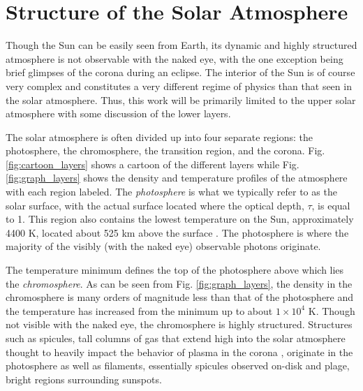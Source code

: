 \section{Structure of the Solar Atmosphere}
\label{sec:structure}
\par Though the Sun can be easily seen from Earth, its dynamic and highly structured atmosphere is not observable with the naked eye, with the one exception being brief glimpses of the corona during an eclipse. The interior of the Sun is of course very complex and constitutes a very different regime of physics than that seen in the solar atmosphere. Thus, this work will be primarily limited to the upper solar atmosphere with some discussion of the lower layers.
%
\par The solar atmosphere is often divided up into four separate regions: the photosphere, the chromosphere, the transition region, and the corona. Fig. \ref{fig:cartoon_layers} shows a cartoon of the different layers while Fig. \ref{fig:graph_layers} shows the density and temperature profiles of the atmosphere with each region labeled. The \textit{photosphere} is what we typically refer to as the solar surface, with the actual surface located where the optical depth, $\tau$, is equal to 1. This region also contains the lowest temperature on the Sun, approximately 4400 K, located about 525 km above the surface \citep{carroll_introduction_2007}. The photosphere is where the majority of the visibly (with the naked eye) observable photons originate.
%
\par The temperature minimum defines the top of the photosphere above which lies the \textit{chromosphere}. As can be seen from Fig. \ref{fig:graph_layers}, the density in the chromosphere is many orders of magnitude less than that of the photosphere and the temperature has increased from the minimum up to about $1\times10^4$ K. Though not visible with the naked eye, the chromosphere is highly structured. Structures such as spicules, tall columns of gas that extend high into the solar atmosphere thought to heavily impact the behavior of plasma in the corona \citep{de_pontieu_origins_2011}, originate in the photosphere as well as filaments, essentially spicules observed on-disk and plage, bright regions surrounding sunspots.
%
